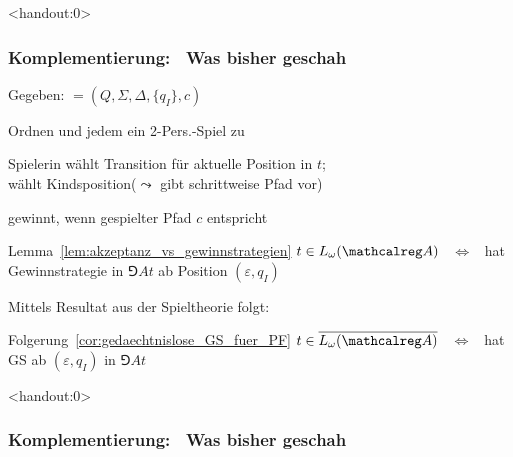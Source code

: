 {
\usebackgroundtemplate{{\Huge\Rewind\Rewind}}%
\def\insertframenumber{\relax}%
  \begin{frame}<handout:0>
    \frametitle{Komplementierung:~ Was bisher geschah \hfill \Rewind\Rewind}
    \addtocounter{framenumber}{-1}%

    \begin{Itemize}
      \item
        Gegeben:  $= (Q,\Sigma,\Delta,\{q_I\},c)$
      \item
        Ordnen  und jedem  ein 2-Pers.-Spiel  zu
      \item
        Spielerin \AUT wählt Transition für aktuelle Position in $t$;\\
        \PF wählt Kindsposition\quad ($\leadsto$ gibt schrittweise Pfad vor)
      \item
        \AUT gewinnt, wenn gespielter Pfad $c$ entspricht
    \end{Itemize}

    \begin{block}{Lemma~\ref{lem:akzeptanz_vs_gewinnstrategien}}
      $t \in L_\omega(\Aut{A})$ ~$\Leftrightarrow$~ \AUT hat Gewinnstrategie in $\Game{A}{t}$ ab Position $(\varepsilon,q_I)$%
    \end{block}

    \par\bigskip
    Mittels Resultat aus der Spieltheorie folgt:

    \begin{block}{Folgerung~\ref{cor:gedaechtnislose_GS_fuer_PF}}
      $t \in \overline{L_\omega(\Aut{A})}$ ~$\Leftrightarrow$~ \PF hat  GS ab $(\varepsilon,q_I)$ in $\Game{A}{t}$
    \end{block}

  \end{frame}

  \begin{frame}<handout:0>
    \frametitle{Komplementierung:~ Was bisher geschah \hfill \Rewind\Rewind}
    \addtocounter{framenumber}{-1}%


\end{frame}}
